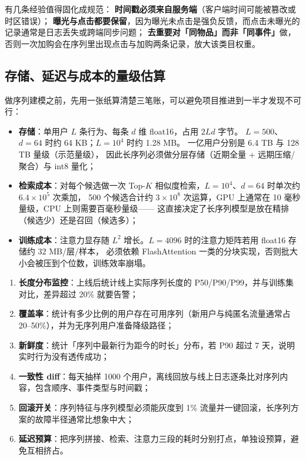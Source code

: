 有几条经验值得固化成规范：
\textbf{时间戳必须来自服务端}（客户端时间可能被篡改或时区错误）；
\textbf{曝光与点击都要保留}，因为曝光未点击是强负反馈，而点击未曝光的记录通常是日志丢失或跨端同步问题；
\textbf{去重要对「同物品」而非「同事件」}做，否则一次加购会在序列里出现点击与加购两条记录，放大该类目权重。

\subsection{存储、延迟与成本的量级估算}

做序列建模之前，先用一张纸算清楚三笔账，可以避免项目推进到一半才发现不可行：

\begin{itemize}
  \item \textbf{存储}：单用户 $L$ 条行为、每条 $d$ 维 float16，占用 $2 L d$ 字节。
        $L = 500$、$d = 64$ 时约 64 KB；$L = 10^4$ 时约 1.28 MB。
        一亿用户分别是 6.4 TB 与 128 TB 量级（示范量级），
        因此长序列必须做分层存储（近期全量 + 远期压缩/聚合）与 int8 量化；
  \item \textbf{检索成本}：对每个候选做一次 Top-$K$ 相似度检索，$L = 10^4$、$d = 64$ 时单次约 $6.4 \times 10^5$ 次乘加，
        500 个候选合计约 $3 \times 10^8$ 次运算，GPU 上通常在 10 毫秒量级，CPU 上则需要百毫秒量级——
        这直接决定了长序列模型是放在精排（候选少）还是召回（候选多）；
  \item \textbf{训练成本}：注意力显存随 $L^2$ 增长。$L = 4096$ 时的注意力矩阵若用 float16 存储约 $32$ MB/层/样本，
        必须依赖 FlashAttention \cite{dao2022flashattention} 一类的分块实现，否则批大小会被压到个位数，训练效率崩塌。
\end{itemize}

\begin{toolbox}[序列特征上线检查清单]
\begin{enumerate}
  \item \textbf{长度分布监控}：上线后统计线上实际序列长度的 P50/P90/P99，并与训练集对比，差异超过 20\% 就要告警；
  \item \textbf{覆盖率}：统计有多少比例的用户存在可用序列（新用户与纯匿名流量通常占 20--50\%），并为无序列用户准备降级路径；
  \item \textbf{新鲜度}：统计「序列中最新行为距今的时长」分布，若 P90 超过 7 天，说明实时行为没有透传成功；
  \item \textbf{一致性 diff}：每天抽样 1000 个用户，离线回放与线上日志逐条比对序列内容，包含顺序、事件类型与时间戳；
  \item \textbf{回滚开关}：序列特征与序列模型必须能灰度到 1\% 流量并一键回滚，长序列方案的故障半径通常比想象中大；
  \item \textbf{延迟预算}：把序列拼接、检索、注意力三段的耗时分别打点，单独设预算，避免互相挤占。
\end{enumerate}
\end{toolbox}

